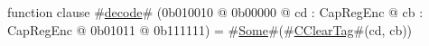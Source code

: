 function clause #\hyperref[sailMIPSzdecode]{decode}# (0b010010 @ 0b00000 @ cd : CapRegEnc @ cb : CapRegEnc @    0b01011 @ 0b111111) = #\hyperref[sailMIPSzSome]{Some}#(#\hyperref[sailMIPSzCClearTag]{CClearTag}#(cd, cb))
